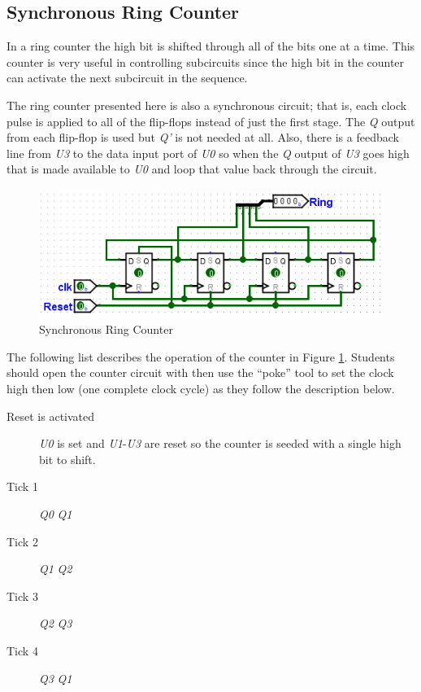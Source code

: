 \subsection{Synchronous Ring Counter}

In a ring counter the high bit is shifted through all of the bits one at a time. This counter is very useful in controlling subcircuits since the high bit in the counter can activate the next subcircuit in the sequence.

The ring counter presented here is also a synchronous circuit; that is, each clock pulse is applied to all of the flip-flops instead of just the first stage. The \textit{Q} output from each flip-flop is used but \textit{Q'} is not needed at all. Also, there is a feedback line from \textit{U3} to the data input port of \textit{U0} so when the \textit{Q} output of \textit{U3} goes high that is made available to \textit{U0} and loop that value back through the circuit.

\begin{figure}[H]
	\centering
	\includegraphics[width=\maxwidth{.95\linewidth}]{gfx/count-04}
	\caption{Synchronous Ring Counter}
	\label{fig:count-04}
\end{figure}

The following list describes the operation of the counter in Figure \ref{fig:count-04}. Students should open the counter circuit with \LE then use the ``poke'' tool to set the clock high then low (one complete clock cycle) as they follow the description below.

\begin{description}
	\item [Reset is activated] \textit{U0} is set and \textit{U1}-\textit{U3} are reset so the counter is seeded with a single high bit to shift.
	
	\item [Tick 1] \textit{Q0} \textdownarrow \: \textemdash \: \textit{Q1} \textuparrow
	
	\item [Tick 2] \textit{Q1} \textdownarrow \: \textemdash \: \textit{Q2} \textuparrow
	
	\item [Tick 3] \textit{Q2} \textdownarrow \: \textemdash \: \textit{Q3} \textuparrow
	
	\item [Tick 4] \textit{Q3} \textdownarrow \: \textemdash \: \textit{Q1} \textuparrow
	
\end{description}

